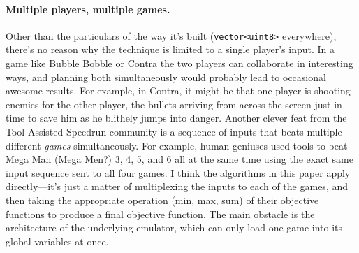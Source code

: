 \documentclass[twocolumn]{article}
\begin{document}
\paragraph{Multiple players, multiple games.} Other than the particulars
of the way it's built (\verb+vector<uint8>+ everywhere), there's no
reason why the technique is limited to a single player's input. In a
game like Bubble Bobble or Contra the two players can collaborate in
interesting ways, and planning both simultaneously would probably lead
to occasional awesome results. For example, in Contra, it might be
that one player is shooting enemies for the other player, the bullets
arriving from across the screen just in time to save him as he
blithely jumps into danger. Another clever feat from the Tool Assisted
Speedrun community is a sequence of inputs that beats multiple
different {\em games} simultaneously. For example, human geniuses used
tools to beat Mega Man (Mega Men?) 3, 4, 5, and 6 all at the same time
using the exact same input sequence sent to all four
games.\cite{BaxterTAS} I think the algorithms in this paper apply
directly---it's just a matter of multiplexing the inputs to each of
the games, and then taking the appropriate operation (min, max, sum) of
their objective functions to produce a final objective function. The
main obstacle is the architecture of the underlying emulator, which
can only load one game into its global variables at once.





\end{document}
